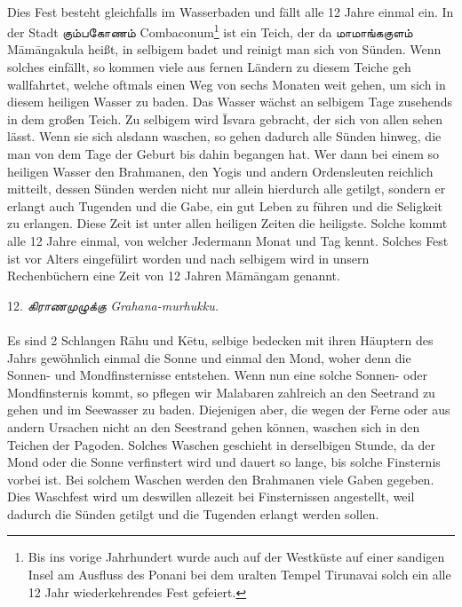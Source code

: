 \documentclass{article}
\newcommand{\TamilText}[1]{\texttamil{#1}}
\newcommand{\tam}[1]{\TamilText{#1}}
\begin{document}
\paragraph{}
Dies Fest besteht gleichfalls im Wasserbaden und fällt alle 12 Jahre einmal ein. In der Stadt \tam{கும்பகோணம்} Combaconum\footnote{Bis ins vorige Jahrhundert wurde auch auf der Westküste auf einer sandigen Insel am Ausfluss des Ponani bei dem uralten Tempel Tirunavai solch ein alle 12 Jahr wiederkehrendes Fest gefeiert.} ist ein Teich, der da \tam{மாமாங்ககுளம்} M\={a}m\={a}ngakula heißt, in selbigem badet und reinigt man sich von Sünden. Wenn solches einfällt, so kommen viele aus fernen Ländern zu diesem Teiche geh wallfahrtet, welche oftmals einen Weg von sechs Monaten weit gehen, um sich in diesem heiligen Wasser zu baden. Das Wasser wächst an selbigem Tage zusehends in dem großen Teich. Zu selbigem wird \={I}svara gebracht, der sich von allen sehen lässt. Wenn sie sich alsdann waschen, so gehen dadurch alle Sünden hinweg, die man von dem Tage der Geburt bis dahin begangen hat. Wer dann bei einem so heiligen Wasser den Brahmanen, den Yogis und andern Ordensleuten reichlich mitteilt, dessen Sünden werden nicht nur allein hierdurch alle getilgt, sondern er erlangt auch Tugenden und die Gabe, ein gut Leben zu führen und die Seligkeit zu erlangen. Diese Zeit ist unter allen heiligen Zeiten die heiligste. Solche kommt alle 12 Jahre einmal, von welcher Jedermann Monat und Tag kennt. Solches Fest ist vor Alters eingefülirt worden und nach selbigem wird in unsern Rechenbüchern eine Zeit von 12 Jahren M\={a}m\={a}ngam genannt.

\begin{center}
12. \emph{\tam{கிராணமுழுக்கு} Grahana-murhukku.}
\end{center}
\paragraph{}
Es sind 2 Schlangen R\={a}hu und K\={e}tu, selbige bedecken mit ihren Häuptern des Jahrs gewöhnlich einmal die Sonne und einmal den Mond, woher denn die Sonnen- und Mondfinsternisse entstehen. Wenn nun eine solche Sonnen- oder Mondfinsternis kommt, so pflegen wir Malabaren zahlreich an den Seetrand zu gehen und im Seewasser zu baden. Diejenigen aber, die wegen der Ferne oder aus andern Ursachen nicht an den Seestrand gehen können, waschen sich in den Teichen der Pagoden. Solches Waschen geschieht in derselbigen Stunde, da der Mond oder die Sonne verfinstert wird und dauert so lange, bis solche Finsternis vorbei ist. Bei solchem Waschen werden den Brahmanen viele Gaben gegeben. Dies Waschfest wird um deswillen allezeit bei Finsternissen angestellt, weil dadurch die Sünden getilgt und die Tugenden erlangt werden sollen.
\end{document}
